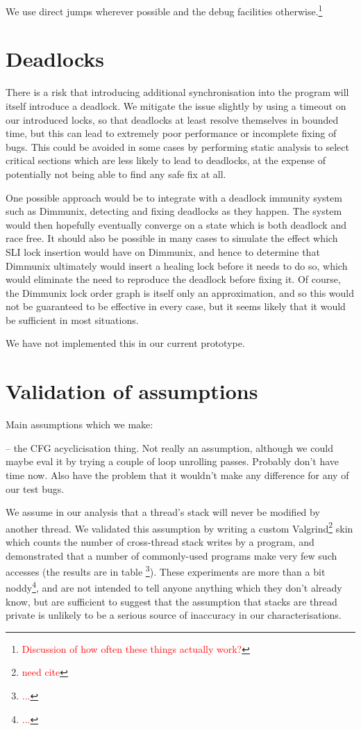 \documentclass[10pt,twocolumn,preprint,natbib,authoryear]{sigplanconf}
\newcommand{\editorial}[1]{\textcolor{red}{\footnote{\textcolor{red}{#1}}}}
\newcommand{\needCite}{\editorial{need cite}}
\begin{document}
We use direct jumps wherever possible and the debug facilities
otherwise.\editorial{Discussion of how often these things actually
  work?}

\section{Deadlocks}

There is a risk that introducing additional synchronisation into the
program will itself introduce a deadlock.  We mitigate the issue
slightly by using a timeout on our introduced locks, so that deadlocks
at least resolve themselves in bounded time, but this can lead to
extremely poor performance or incomplete fixing of bugs.  This could
be avoided in some cases by performing static analysis to select
critical sections which are less likely to lead to deadlocks, at the
expense of potentially not being able to find any safe fix at all.

One possible approach would be to integrate with a deadlock immunity
system such as Dimmunix\cite{Jula2008}, detecting and fixing deadlocks
as they happen.  The system would then hopefully eventually converge
on a state which is both deadlock and race free.  It should also be
possible in many cases to simulate the effect which SLI lock insertion
would have on Dimmunix, and hence to determine that Dimmunix
ultimately would insert a healing lock before it needs to do so, which
would eliminate the need to reproduce the deadlock before fixing it.
Of course, the Dimmunix lock order graph is itself only an
approximation, and so this would not be guaranteed to be effective in
every case, but it seems likely that it would be sufficient in most
situations.

We have not implemented this in our current prototype.

\section{Validation of assumptions}

Main assumptions which we make:

-- the CFG acyclicisation thing.  Not really an assumption, although
we could maybe eval it by trying a couple of loop unrolling passes.
Probably don't have time now.  Also have the problem that it wouldn't
make any difference for any of our test bugs.

We assume in our analysis that a thread's stack will never be modified
by another thread.  We validated this assumption by writing a custom
Valgrind\needCite{} skin which counts the number of cross-thread stack
writes by a program, and demonstrated that a number of commonly-used
programs make very few such accesses (the results are in table
\editorial{...}).  These experiments are more than a bit
noddy\editorial{...}, and are not intended to tell anyone anything
which they don't already know, but are sufficient to suggest that the
assumption that stacks are thread private is unlikely to be a serious
source of inaccuracy in our characterisations.
\end{document}
